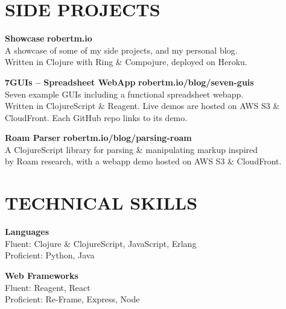 \documentclass[line,margin]{res}
\begin{document}
\begin{resume}
\section{SIDE PROJECTS}
    \begin{description}
        \item \textbf{Showcase} \hfill \textbf{robertm.io} \\
          A showcase of some of my side projects, and my personal blog. \\
          Written in Clojure with Ring \& Compojure, deployed on Heroku.

        \item \textbf{7GUIs -- Spreadsheet WebApp} \hfill \textbf{robertm.io/blog/seven-guis} \\
          Seven example GUIs including a functional spreadsheet webapp. \\
          Written in ClojureScript \& Reagent. Live demos are hosted
          on AWS S3 \& CloudFront. Each GitHub repo links to its demo.

        \item \textbf{Roam Parser} \hfill \textbf{robertm.io/blog/parsing-roam} \\
          A ClojureScript library for parsing \& manipulating markup inspired \\
          by Roam research, with a webapp demo hosted on AWS S3 \& CloudFront.
    \end{description}


\section{TECHNICAL SKILLS}
    \begin{description}
        \item \textbf{Languages} \hfill \\
          Fluent: Clojure \& ClojureScript, JavaScript, Erlang \\
          Proficient: Python, Java
        \item \textbf{Web Frameworks} \hfill \\
          Fluent: Reagent, React \\
          Proficient: Re-Frame, Express, Node
    \end{description}

\end{resume}
\end{document}
